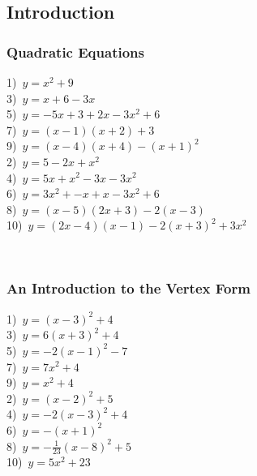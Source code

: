 \subsection{Introduction}

\subsubsection{Quadratic Equations}
 
{}

\begin{multicols}{2}
  1)~$y=x^2 + 9$\\
	3)~$y=x+6-3x$\\
	5)~$y=-5x+3+2x-3x^2+6$\\
  7)~$y=(x-1)(x+2)+3$\\
  9)~$y=(x-4)(x+4)-(x+1)^2$\\
	2)~$y=5-2x+x^2$\\
	4)~$y=5x+x^2-3x-3x^2$\\
  6)~$y=3x^2+-x+x-3x^2+6$\\
  8)~$y=(x-5)(2x+3)-2(x-3)$\\
  10)~$y=(2x-4)(x-1)-2(x+3)^2+3x^2$
\end{multicols}

~\\%

\subsubsection{An Introduction to the Vertex Form} 

{}

\begin{multicols}{2}
  1)~$y=(x-3)^2+4$\\
  3)~$y=6(x+3)^2+4$\\
  5)~$y=-2(x-1)^2-7$\\
  7)~$y=7x^2+4$\\
  9)~$y=x^2+4$\\
  2)~$y=(x-2)^2+5$\\
  4)~$y=-2(x-3)^2+4$\\
  6)~$y=-(x+1)^2$\\
  8)~$y=-\frac{1}{23}(x-8)^2+5$\\
  10)~$y=5x^2+23$
\end{multicols}

